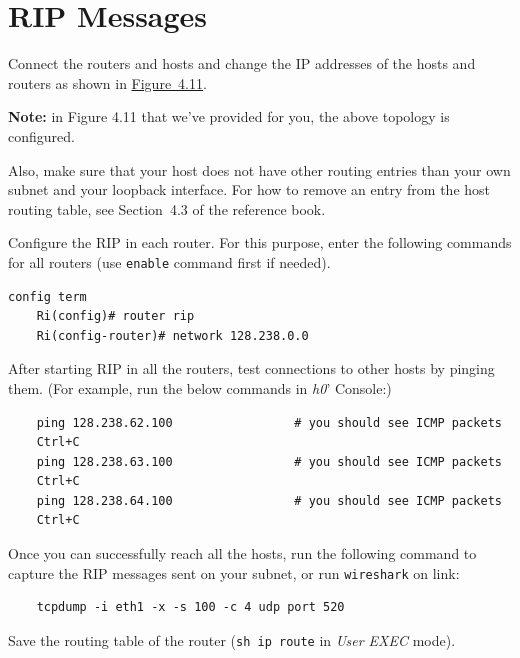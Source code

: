\documentclass{UTNetLab}
\begin{document}
\section{RIP Messages}
    Connect the routers and hosts and change the IP addresses of the hosts and routers as shown in \hyperref[fig:4.11]{Figure~4.11}.
    
     \textbf{Note:} in Figure 4.11 that we've provided for you, the above topology is configured.
     
    Also, make sure that your host does not have other routing entries than your own subnet and your loopback interface.
    For how to remove an entry from the host routing table, see Section~4.3 of the reference book.

    Configure the RIP in each router. For this purpose, enter the following commands for all routers (use \lstinline[language={cisco}]{enable} command first if needed).
    
    \begin{lstlisting}[frame=trBL,language={cisco}]
    config term
    Ri(config)# router rip
    Ri(config-router)# network 128.238.0.0
    \end{lstlisting}
    
    After starting RIP in all the routers, test connections to other hosts by pinging them. (For example, run the below commands in \textit{h0}' Console:)
    
    \begin{lstlisting}
    ping 128.238.62.100					# you should see ICMP packets
    Ctrl+C
    ping 128.238.63.100					# you should see ICMP packets
    Ctrl+C
    ping 128.238.64.100					# you should see ICMP packets
    Ctrl+C
    \end{lstlisting}

    Once you can successfully reach all the hosts, run the following command to capture the RIP messages sent on your subnet, or run \lstinline{wireshark} on link:

    \begin{lstlisting}
    tcpdump -i eth1 -x -s 100 -c 4 udp port 520
    \end{lstlisting}

    Save the routing table of the router (\lstinline{sh ip route} in \textit{User EXEC} mode).
    
\end{document}
